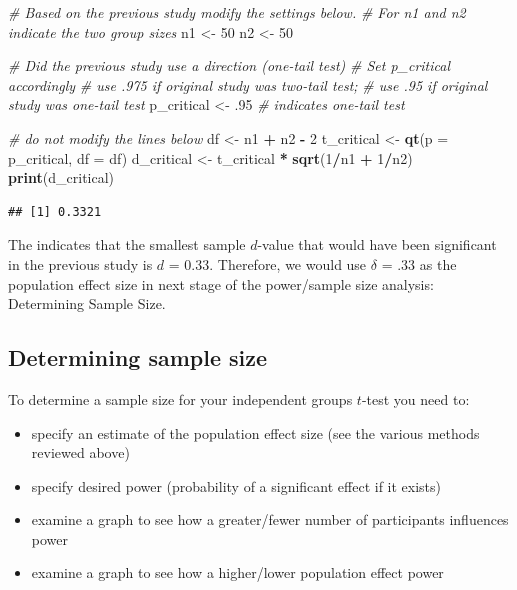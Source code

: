 \documentclass[
]{krantz}
\makeatletter
\newenvironment{Shaded}{\begin{snugshade}}{\end{snugshade}}
\newcommand{\CommentTok}[1]{\textcolor[rgb]{0.37,0.37,0.37}{\textit{#1}}}
\newcommand{\DataTypeTok}[1]{\textcolor[rgb]{0.27,0.27,0.27}{#1}}
\newcommand{\DecValTok}[1]{\textcolor[rgb]{0.06,0.06,0.06}{#1}}
\newcommand{\FloatTok}[1]{\textcolor[rgb]{0.06,0.06,0.06}{#1}}
\newcommand{\KeywordTok}[1]{\textcolor[rgb]{0.27,0.27,0.27}{\textbf{#1}}}
\newcommand{\NormalTok}[1]{#1}
\newcommand{\OperatorTok}[1]{\textcolor[rgb]{0.43,0.43,0.43}{\textbf{#1}}}
\newcommand{\StringTok}[1]{\textcolor[rgb]{0.5,0.5,0.5}{#1}}
\newenvironment{kframe}{%
\medskip{}
\setlength{\fboxsep}{.8em}
 \def\at@end@of@kframe{}%
 \ifinner\ifhmode%
  \def\at@end@of@kframe{\end{minipage}}%
  \begin{minipage}{\columnwidth}%
 \fi\fi%
 \def\FrameCommand##1{\hskip\@totalleftmargin \hskip-\fboxsep
 \colorbox{shadecolor}{##1}\hskip-\fboxsep
     \hskip-\linewidth \hskip-\@totalleftmargin \hskip\columnwidth}%
 \MakeFramed {\advance\hsize-\width
   \@totalleftmargin\z@ \linewidth\hsize
   \@setminipage}}%
 {\par\unskip\endMakeFramed%
 \at@end@of@kframe}
\renewenvironment{Shaded}{\begin{kframe}}{\end{kframe}}
\makeatother
\begin{document}
\begin{Shaded}
\begin{Highlighting}[]
\CommentTok{# Based on the previous study modify the settings below.}
\CommentTok{# For n1 and n2 indicate the two group sizes}
\NormalTok{n1 <-}\StringTok{ }\DecValTok{50}
\NormalTok{n2 <-}\StringTok{ }\DecValTok{50}

\CommentTok{# Did the previous study use a direction (one-tail test)}
\CommentTok{# Set p_critical accordingly}
\CommentTok{# use .975 if original study was two-tail test;}
\CommentTok{# use .95 if original study was one-tail test}
\NormalTok{p_critical <-}\StringTok{ }\FloatTok{.95} \CommentTok{# indicates one-tail test}

\CommentTok{# do not modify the lines below}
\NormalTok{df <-}\StringTok{ }\NormalTok{n1 }\OperatorTok{+}\StringTok{ }\NormalTok{n2 }\OperatorTok{-}\StringTok{ }\DecValTok{2}
\NormalTok{t_critical <-}\StringTok{ }\KeywordTok{qt}\NormalTok{(}\DataTypeTok{p =}\NormalTok{ p_critical, }\DataTypeTok{df =}\NormalTok{ df) }
\NormalTok{d_critical <-}\StringTok{ }\NormalTok{t_critical }\OperatorTok{*}\StringTok{ }\KeywordTok{sqrt}\NormalTok{(}\DecValTok{1}\OperatorTok{/}\NormalTok{n1 }\OperatorTok{+}\StringTok{ }\DecValTok{1}\OperatorTok{/}\NormalTok{n2)}
\KeywordTok{print}\NormalTok{(d_critical)}
\end{Highlighting}
\end{Shaded}

\begin{verbatim}
## [1] 0.3321
\end{verbatim}

The indicates that the smallest sample \(d\)-value that would have been significant in the previous study is \(d\) = 0.33. Therefore, we would use \(\delta\) = .33 as the population effect size in next stage of the power/sample size analysis: Determining Sample Size.

\hypertarget{determining-sample-size}{%
\subsection{Determining sample size}\label{determining-sample-size}}

To determine a sample size for your independent groups \(t\)-test you need to:

\begin{itemize}
\item
  specify an estimate of the population effect size (see the various methods reviewed above)
\item
  specify desired power (probability of a significant effect if it exists)
\item
  examine a graph to see how a greater/fewer number of participants influences power
\item
  examine a graph to see how a higher/lower population effect power
\end{itemize}
\end{document}

